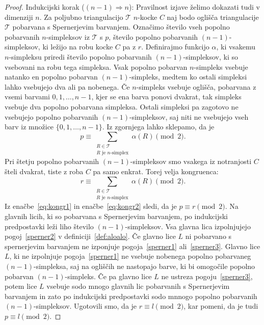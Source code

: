 \documentclass[mat1]{fmfdelo}
\newcommand{\0}{0}
\newcommand{\pT}{\mathcal T}
\begin{document}
\begin{proof}
Indukcijski korak ($(n - 1) \Longrightarrow n$):
Pravilnost izjave želimo dokazati tudi v dimenziji $n$. Za poljubno triangulacijo $\pT$ $n$-kocke $C$ naj bodo oglišča triangulacije $\pT$ pobarvana s Spernerjevim barvanjem. Označimo število vseh popolno pobarvanih $n$-simpleksov iz $\pT$ s $p$, število popolno pobarvanih $(n-1)$-simpleksov, ki ležijo na robu kocke $C$ pa z $r$. Definirajmo funkcijo $\alpha$, ki vsakemu $n$-simpleksu priredi število popolno pobarvanih $(n-1)$-simpleksov, ki so vsebovani na robu tega simpleksa. Vsak popolno pobarvan $n$-simpleks vsebuje natanko en popolno pobarvan $(n-1)$-simpleks, medtem ko ostali simpleksi lahko vsebujejo dva ali pa nobenega. Če $n$-simpleks vsebuje oglišča, pobarvana z vsemi barvami $0, 1, \dots, n-1$, kjer se ena barva ponovi dvakrat, tak simpleks vsebuje dva popolno pobarvana simpleksa. Ostali simpleksi pa zagotovo ne vsebujejo popolno pobarvanih $(n - 1)$-simpleksov, saj niti ne vsebujejo vseh barv iz množice $\{0, 1, \dots, n-1 \}$. Iz zgornjega lahko sklepamo, da je
\begin{equation}\label{eq:kongr1}
p \equiv 
\sum\limits_{\substack{
R \in \pT
 \\ 
R\text{ je } n\text{-simplex}
 }}
  \alpha(R) \pmod 2.
\end{equation}
Pri štetju popolno pobarvanih $(n - 1)$-simpleksov smo vsakega iz notranjosti $C$ šteli dvakrat, tiste z roba $C$ pa samo enkrat. Torej velja kongruenca:
\begin{equation}\label{eq:kongr2}
r \equiv 
\sum\limits_{\substack{
R \in \pT
 \\ 
R\text{ je } n\text{-simplex}
 }}
  \alpha(R) \pmod 2.
\end{equation}
Iz enačbe~\eqref{eq:kongr1} in enačbe~\eqref{eq:kongr2} sledi, da je $p \equiv r \pmod 2$.
Na glavnih licih, ki so pobarvana s Spernerjevim barvanjem, po indukcijski predpostavki leži liho število $(n-1)$-simpleksov. Vsa glavna lica izpolnjujejo pogoj~\ref{sperner2} v definiciji~\ref{def:aloalo}. Če glavno lice $L$ ni pobarvano s spernerjevim barvanjem ne izponjuje pogoja~\ref{sperner1} ali~\ref{sperner3}. Glavno lice $L$, ki ne izpolnjuje pogoja~\ref{sperner1} ne vsebuje nobenega popolno pobarvaneg $(n-1)$-simpleksa, saj na ogliščih ne nastopajo barve, ki bi omogočile popolno pobarvan $(n-1)$-simpleks. Če pa glavno lice $L$ ne ustreza pogoju~\ref{sperner3}, potem lice $L$ vsebuje sodo mnogo glavnih lic pobarvanih s Spernerjevim barvanjem in zato po indukcijski predpostavki sodo mnnogo popolno pobarvanih $(n-1)$-simpleksov. Ugotovili smo, da je $r \equiv l \pmod 2$, kar pomeni, da je tudi $p \equiv l \pmod 2$.
\end{proof}
\end{document}
